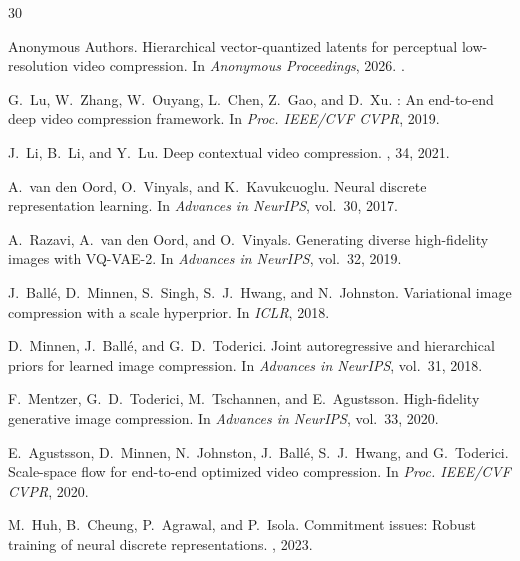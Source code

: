 \documentclass[sigconf, screen, review, anonymous]{acmart}
\begin{document}

\begin{thebibliography}{30}

Anonymous Authors.
\newblock Hierarchical vector-quantized latents for perceptual low-resolution
  video compression.
\newblock In {\em Anonymous Proceedings}, 2026.
.

G.~Lu, W.~Zhang, W.~Ouyang, L.~Chen, Z.~Gao, and D.~Xu.
: An end-to-end deep video compression framework.
\newblock In {\em Proc. IEEE/CVF CVPR}, 2019.

J.~Li, B.~Li, and Y.~Lu.
\newblock Deep contextual video compression.
, 34, 2021.

A.~van den Oord, O.~Vinyals, and K.~Kavukcuoglu.
\newblock Neural discrete representation learning.
\newblock In {\em Advances in NeurIPS}, vol.~30, 2017.

A.~Razavi, A.~van den Oord, and O.~Vinyals.
\newblock Generating diverse high-fidelity images with {VQ-VAE-2}.
\newblock In {\em Advances in NeurIPS}, vol.~32, 2019.

J.~Ball\'{e}, D.~Minnen, S.~Singh, S.~J.~Hwang, and N.~Johnston.
\newblock Variational image compression with a scale hyperprior.
\newblock In {\em ICLR}, 2018.

D.~Minnen, J.~Ball\'{e}, and G.~D.~Toderici.
\newblock Joint autoregressive and hierarchical priors for learned image
  compression.
\newblock In {\em Advances in NeurIPS}, vol.~31, 2018.

F.~Mentzer, G.~D.~Toderici, M.~Tschannen, and E.~Agustsson.
\newblock High-fidelity generative image compression.
\newblock In {\em Advances in NeurIPS}, vol.~33, 2020.

E.~Agustsson, D.~Minnen, N.~Johnston, J.~Ball\'{e}, S.~J.~Hwang, and
  G.~Toderici.
\newblock Scale-space flow for end-to-end optimized video compression.
\newblock In {\em Proc. IEEE/CVF CVPR}, 2020.

M.~Huh, B.~Cheung, P.~Agrawal, and P.~Isola.
\newblock Commitment issues: Robust training of neural discrete representations.
, 2023.


\end{thebibliography}
\end{document}
